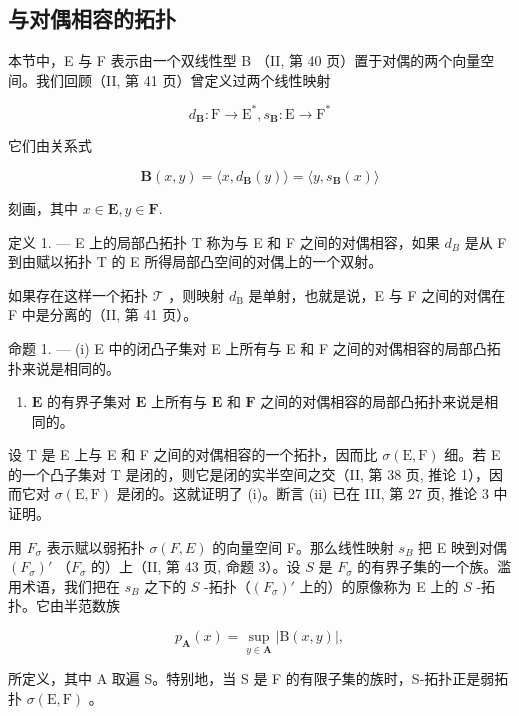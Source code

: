 \subsection{与对偶相容的拓扑}

本节中，E 与 F 表示由一个双线性型 B （II, 第 40 页）置于对偶的两个向量空间。我们回顾（II, 第 41 页）曾定义过两个线性映射

\[
d _ {\mathbf {B}}: \mathrm{F} \to \mathrm{E} ^ {*}, s _ {\mathbf {B}}: \mathrm{E} \to \mathrm{F} ^ {*}
\]

它们由关系式

\[
\mathbf {B} (x, y) = \langle x, d _ {\mathbf {B}} (y) \rangle = \langle y, s _ {\mathbf {B}} (x) \rangle\tag{1}
\]

刻画，其中 \(x\in \mathbf{E},y\in \mathbf{F}.\)

定义 1. --- E 上的局部凸拓扑 T 称为与 E 和 F 之间的对偶相容，如果 \(d_{B}\) 是从 F 到由赋以拓扑 T 的 E 所得局部凸空间的对偶上的一个双射。

如果存在这样一个拓扑 \(\mathcal{T}\) ，则映射 \(d_{\mathrm{B}}\) 是单射，也就是说，E 与 F 之间的对偶在 F 中是分离的（II, 第 41 页）。

命题 1. --- (i) E 中的闭凸子集对 E 上所有与 E 和 F 之间的对偶相容的局部凸拓扑来说是相同的。

\begin{enumerate}
\def\labelenumi{(\roman{enumi})}
\setcounter{enumi}{1}
\tightlist
\item
  \(\mathbf{E}\) 的有界子集对 \(\mathbf{E}\) 上所有与 \(\mathbf{E}\) 和 \(\mathbf{F}\) 之间的对偶相容的局部凸拓扑来说是相同的。
\end{enumerate}

设 T 是 E 上与 E 和 F 之间的对偶相容的一个拓扑，因而比 \(\sigma(\mathrm{E},\mathrm{F})\) 细。若 E 的一个凸子集对 T 是闭的，则它是闭的实半空间之交（II, 第 38 页, 推论 1），因而它对 \(\sigma(\mathrm{E},\mathrm{F})\) 是闭的。这就证明了 (i)。断言 (ii) 已在 III, 第 27 页, 推论 3 中证明。

用 \(F_{\sigma}\) 表示赋以弱拓扑 \(\sigma(F, E)\) 的向量空间 F。那么线性映射 \(s_{B}\) 把 E 映到对偶 \((F_{\sigma})'\) （\(F_{\sigma}\) 的）上（II, 第 43 页, 命题 3）。设 \(S\) 是 \(F_{\sigma}\) 的有界子集的一个族。滥用术语，我们把在 \(s_{B}\) 之下的 \(S\) -拓扑（\((F_{\sigma})'\) 上的）的原像称为 E 上的 \(S\) -拓扑。它由半范数族

\[
p _ {\mathbf {A}} (x) = \sup _ {y \in \mathbf {A}} | \mathrm{B} (x, y) |,\tag{2}
\]

所定义，其中 A 取遍 S。特别地，当 S 是 F 的有限子集的族时，S-拓扑正是弱拓扑 \(\sigma(\mathrm{E}, \mathrm{F})\) 。

